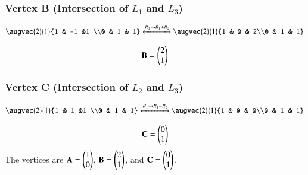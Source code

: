 \documentclass[journal]{IEEEtran}
\begin{document}
\subsubsection*{Vertex B (Intersection of $L_1$ and $L_3$)}
\begin{align}
   \augvec{2}{1}{1 & -1 &1 \\0 & 1 & 1}\xleftrightarrow[]{R_1\rightarrow R_1+R_2}\augvec{2}{1}{1 & 0 & 2\\0 & 1 & 1}
\end{align}

\begin{align}
    \mathbf{B}=\begin{pmatrix}2\\1\end{pmatrix}
\end{align}
\subsubsection*{Vertex C (Intersection of $L_2$ and $L_3$)}
\begin{align}
   \augvec{2}{1}{1 & 1 &1 \\0 & 1 & 1}\xleftrightarrow[]{R_1\rightarrow R_1-R_2}\augvec{2}{1}{1 & 0 & 0\\0 & 1 & 1}
\end{align}

\begin{align}
    \mathbf{C}=\begin{pmatrix}0\\1\end{pmatrix}
\end{align}
The vertices are $\mathbf{A}=\begin{pmatrix}1\\0\end{pmatrix}$, $\mathbf{B}=\begin{pmatrix}2\\1\end{pmatrix}$, and $\mathbf{C}=\begin{pmatrix}0\\1\end{pmatrix}$.
\end{document}
